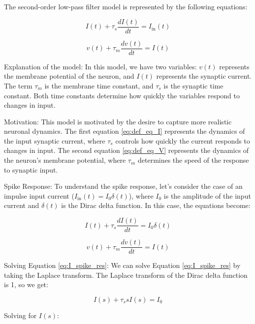\documentclass{article}
\begin{document}
The second-order low-pass filter model is represented by the following equations:

\begin{equation} \label{eq:def_eq_I}
    I(t) + \tau_s \frac{dI(t)}{dt} = I_{\text{in}}(t)
\end{equation}

\begin{equation} \label{eq:def_eq_V}
    v(t) + \tau_m \frac{dv(t)}{dt} = I(t)
\end{equation}

Explanation of the model:
In this model, we have two variables: $v(t)$ represents the membrane potential of the neuron, and $I(t)$ represents the synaptic current. The term $\tau_m$ is the membrane time constant, and $\tau_s$ is the synaptic time constant. Both time constants determine how quickly the variables respond to changes in input.

Motivation:
This model is motivated by the desire to capture more realistic neuronal dynamics. The first equation \ref{eq:def_eq_I} represents the dynamics of the input synaptic current, where $\tau_s$ controls how quickly the current responds to changes in input. The second equation \ref{eq:def_eq_V} represents the dynamics of the neuron's membrane potential, where $\tau_m$ determines the speed of the response to synaptic input.

Spike Response:
To understand the spike response, let's consider the case of an impulse input current ($I_{\text{in}}(t) = I_0 \delta(t)$), where $I_0$ is the amplitude of the input current and $\delta(t)$ is the Dirac delta function. In this case, the equations become:

\begin{equation} \label{eq:I_spike_res}
    I(t) + \tau_s \frac{dI(t)}{dt} = I_0 \delta(t)
\end{equation}

\begin{equation} \label{eq:V_spike_res}
    v(t) + \tau_m \frac{dv(t)}{dt} = I(t)
\end{equation}

Solving Equation \ref{eq:I_spike_res}:
We can solve Equation \ref{eq:I_spike_res} by taking the Laplace transform. The Laplace transform of the Dirac delta function is 1, so we get:

\begin{equation}
    I(s) + \tau_s s I(s) = I_0
\end{equation}

Solving for $I(s)$:
\end{document}
